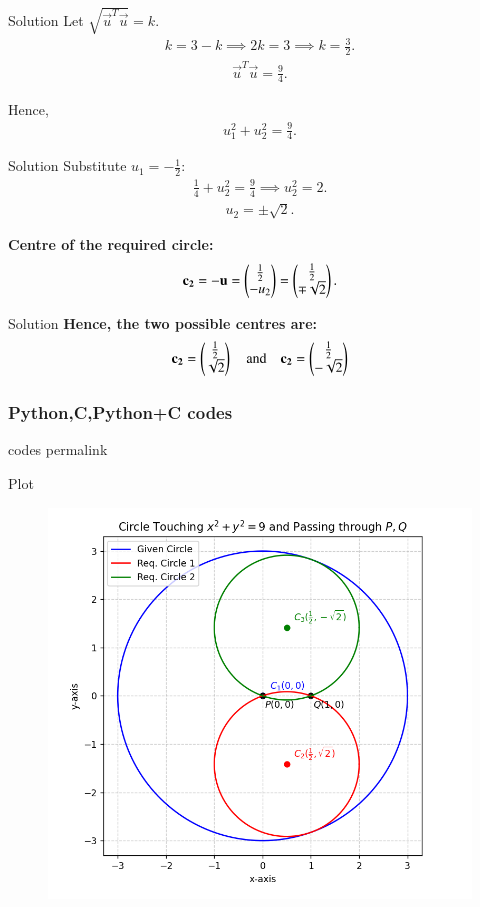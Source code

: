 \documentclass{beamer}
\begin{document}
\begin{frame}{Solution}
    Let $\sqrt{\vec{u}^{T}\vec{u}} = k$.
\begin{align}
k = 3 - k \implies 2k = 3 \implies k = \frac{3}{2}.
\end{align}
\begin{align}
\vec{u}^{T}\vec{u} = \frac{9}{4}.
\end{align}

Hence,
\begin{align}
u_1^2 + u_2^2 = \frac{9}{4}.
\end{align}
\end{frame}

\begin{frame}{Solution}
    Substitute $u_1 = -\frac{1}{2}$:
\begin{align}
\frac{1}{4} + u_2^2 = \frac{9}{4} \implies u_2^2 = 2.
\end{align}
\begin{align}
u_2 = \pm \sqrt{2}.
\end{align}


\textbf{Centre of the required circle:}
\begin{align}
\mathbf{c_2} = -\mathbf{u} = \begin{pmatrix}\frac{1}{2} \\ -u_2\end{pmatrix} = 
\begin{pmatrix}\frac{1}{2} \\ \mp \sqrt{2}\end{pmatrix}.
\end{align}
\end{frame}

\begin{frame}{Solution}
    \textbf{Hence, the two possible centres are:}
\begin{align}
\mathbf{c_2} = \begin{pmatrix}\frac{1}{2} \\ \sqrt{2}\end{pmatrix} \quad \text{and} \quad
\mathbf{c_2} = \begin{pmatrix}\frac{1}{2} \\ -\sqrt{2}\end{pmatrix}
\end{align}
\end{frame}

\begin{frame}[fragile]
\frametitle{Python,C,Python+C codes}
codes permalink
\end{frame}

\begin{frame}{Plot}
    \begin{figure}[h!]
    \centering
    \includegraphics[height=0.5\textheight, keepaspectratio]{figs/fig.png}
    \label{figure_1}
\end{figure}
\end{frame}
\end{document}

